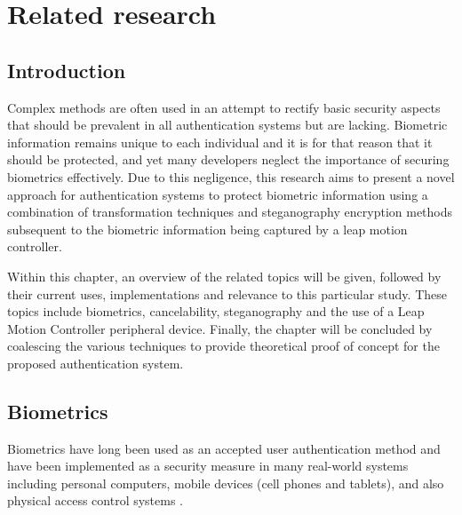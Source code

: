 
\chapter{Related research}



\section[Introduction]{Introduction}
Complex methods are often used in an attempt to rectify basic security aspects that should be prevalent in all authentication systems but are lacking. Biometric information remains unique to each individual and it is for that reason that it should be protected, and yet many developers neglect the importance of securing biometrics effectively. Due to this negligence, this research aims to present a novel approach for authentication systems to protect biometric information using a combination of transformation techniques and steganography encryption methods subsequent to the biometric information being captured by a leap motion controller. 

Within this chapter, an overview of the related topics will be given, followed by their current uses, implementations and relevance to this particular study. These topics include biometrics, cancelability, steganography and the use of a Leap Motion Controller peripheral device. Finally, the chapter will be concluded by coalescing the various techniques to provide theoretical proof of concept for the proposed authentication system.


\section[Biometrics]{Biometrics}
Biometrics have long been used as an accepted user authentication method and have been implemented as a security measure in many real-world systems including personal computers, mobile devices (cell phones and tablets), and also physical access control systems \cite{Shahim2016}.

